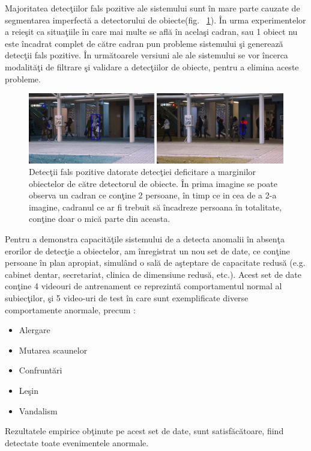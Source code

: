 \documentclass[a4paper,12pt]{report}
\begin{document}
\par Majoritatea detecţiilor fals pozitive ale sistemului sunt în mare parte cauzate de segmentarea imperfectă a detectorului de obiecte(fig.  ~\ref{fig:eroare_detectie}). În urma experimentelor a reieşit ca situaţiile în care mai multe se află în acelaşi cadran, sau 1 obiect nu este încadrat complet de către cadran pun probleme sistemului şi generează detecţii fals pozitive. În următoarele versiuni ale ale sistemului se vor încerca modalităţi de filtrare şi validare a detecţiilor de obiecte, pentru a elimina aceste probleme. 
\begin{figure}[h]
\begin{center}
        \includegraphics[width = 1\textwidth]{images/eroare_detectie}
			 \caption{Detecţii fals pozitive datorate detecţiei deficitare a marginilor obiectelor de către detectorul de obiecte. În prima imagine se poate observa un cadran ce conţine 2 persoane, în timp ce in cea de a 2-a imagine, cadranul ce ar fi trebuit să încadreze persoana în totalitate, conţine doar o mică parte din aceasta.}
			 \label{fig:eroare_detectie}
\end{center}
\end{figure}
\par Pentru a demonstra capacităţile sistemului de a detecta anomalii în absenţa erorilor de detecţie a obiectelor, am înregistrat un nou set de date, ce conţine persoane în plan apropiat, simulând o sală de aşteptare de capacitate redusă (e.g. cabinet dentar, secretariat, clinica de dimensiune redusă, etc.). Acest set de date conţine 4 videouri de antrenament ce reprezintă comportamentul normal al subiecţilor, şi 5 video-uri de test în care sunt exemplificate diverse comportamente anormale, precum :
\begin{itemize}
\item Alergare
\item Mutarea scaunelor
\item Confruntări
\item Leşin
\item Vandalism 
\end{itemize}
\par Rezultatele empirice obţinute pe acest set de date, sunt satisfăcătoare, fiind detectate toate evenimentele anormale. 
\end{document}
